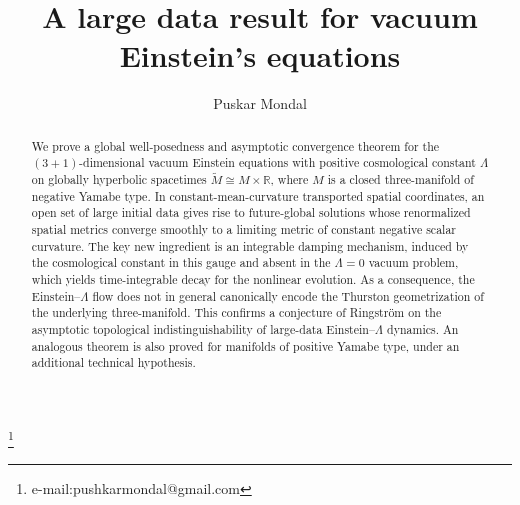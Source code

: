 \documentclass{amsart}
\begin{document}
	
\title{A large data result for vacuum Einstein's equations}%


\author{Puskar Mondal}\footnote{ e-mail:pushkarmondal@gmail.com}


\maketitle

	



\begin{abstract}
We prove a global well-posedness and asymptotic convergence theorem for the \((3+1)\)-dimensional vacuum Einstein equations with positive cosmological constant \(\Lambda\) on globally hyperbolic spacetimes \(\widetilde M \cong M \times \mathbb R\), where \(M\) is a closed three-manifold of negative Yamabe type. In constant-mean-curvature transported spatial coordinates, an open set of large initial data gives rise to future-global solutions whose renormalized spatial metrics converge smoothly to a limiting metric of constant negative scalar curvature. The key new ingredient is an integrable damping mechanism, induced by the cosmological constant in this gauge and absent in the \(\Lambda=0\) vacuum problem, which yields time-integrable decay for the nonlinear evolution. As a consequence, the Einstein--\(\Lambda\) flow does not in general canonically encode the Thurston geometrization of the underlying three-manifold. This confirms a conjecture of Ringstr\"om on the asymptotic topological indistinguishability of large-data Einstein--\(\Lambda\) dynamics. An analogous theorem is also proved for manifolds of positive Yamabe type, under an additional technical hypothesis.
\end{abstract}









\setcounter{tocdepth}{2}
{\hypersetup{linkcolor=black}
\small
\tableofcontents
}
\end{document}
